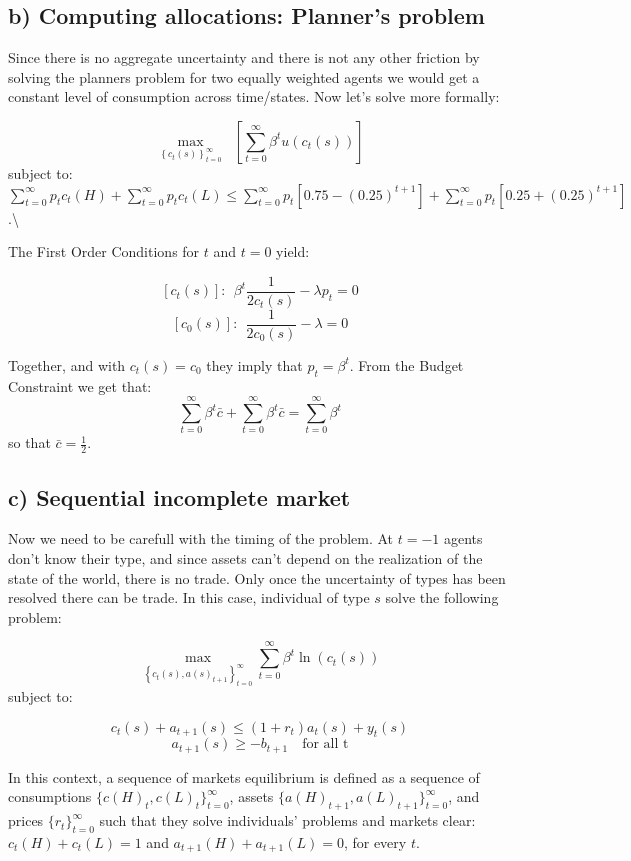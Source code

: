\documentclass[11pt]{article}
\begin{document}
    \hypertarget{b-computing-allocations-planners-problem}{%
\subsection{b) Computing allocations: Planner's
problem}\label{b-computing-allocations-planners-problem}}

Since there is no aggregate uncertainty and there is not any other
friction by solving the planners problem for two equally weighted agents
we would get a constant level of consumption across time/states. Now
let's solve more formally:

\[
\max_{\left\{c_t(s)\right\}_{t=0}^\infty} \mathop{E_{-1}}  \left[\sum_{t=0}^{\infty} \beta^t u(c_t(s))\right]
\] subject to:
\(\sum_{t=0}^{\infty} p_t c_t(H)+\sum_{t=0}^{\infty} p_t c_t(L)\leq \sum_{t=0}^{\infty} p_t[0.75-(0.25)^{t+1}]+ \sum_{t=0}^{\infty} p_t[0.25+(0.25)^{t+1}]\).\textbackslash{}

The First Order Conditions for \(t\) and \(t=0\) yield:

\[
[c_t(s)]: \ \ \beta^t\frac{1}{2c_t(s)}- \lambda p_t=0 
\] \[
[c_0(s)]: \ \ \frac{1}{2c_0(s)}- \lambda=0
 \]

Together, and with \(c_t(s)=c_0\) they imply that \(p_t=\beta^t\). From
the Budget Constraint we get that: \[
\sum_{t=0}^{\infty} \beta^t \bar{c}+\sum_{t=0}^{\infty} \beta^t \bar{c}= \sum_{t=0}^{\infty} \beta^t
\] so that \(\bar{c}=\frac{1}{2}\).

    \hypertarget{c-sequential-incomplete-market}{%
\subsection{c) Sequential incomplete
market}\label{c-sequential-incomplete-market}}

Now we need to be carefull with the timing of the problem. At \(t=-1\)
agents don't know their type, and since assets can't depend on the
realization of the state of the world, there is no trade. Only once the
uncertainty of types has been resolved there can be trade. In this case,
individual of type \(s\) solve the following problem:

\[
\max_{\left\{c_t(s),a(s)_{t+1}\right\}_{t=0}^\infty}  \sum_{t=0}^{\infty} \beta^t \ln(c_t(s))
\] subject to:

\[c_t(s)+a_{t+1}(s)\leq (1+r_t)a_t(s)+y_t(s)\]
\[a_{t+1}(s)\geq -b_{t+1} \quad \text{for all t}\]

In this context, a sequence of markets equilibrium is defined as a
sequence of consumptions \(\{c(H)_t,c(L)_t\}_{t=0}^{\infty}\), assets
\(\{a(H)_{t+1},a(L)_{t+1}\}_{t=0}^{\infty}\), and prices
\(\{r_t\}_{t=0}^{\infty}\) such that they solve individuals' problems
and markets clear: \(c_t(H)+c_t(L)=1\) and \(a_{t+1}(H)+a_{t+1}(L)=0\),
for every \(t\).
\end{document}
